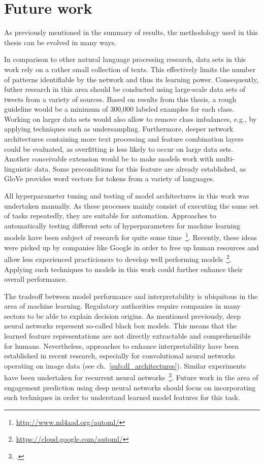 \section{Future work}
\label{ch:future_work}

As previously mentioned in the summary of results, the methodology used in this
thesis can be evolved in many ways.

In comparison to other natural language processing research, data sets in this
work rely on a rather small collection of texts.
This effectively limits the number of patterns identifiable by the network and
thus its learning power.
Consequently, futher research in this area should be conducted using large-scale
data sets of tweets from a variety of sources.
Based on results from this thesis, a rough guideline would be a minimum
of 300,000 labeled examples for each class.
Working on larger data sets would also allow to remove class imbalances,
e.g., by applying techniques such as undersampling.
Furthermore, deeper network architectures containing more text processing
and feature combination layers could be evaluated, as overfitting is less likely
to occur on large data sets.
Another conceivable extension would be to make models work with multi-linguistic
data.
Some preconditions for this feature are already established, as GloVe provides word
vectors for tokens from a variety of languages.

All hyperparameter tuning and testing of model architectures in this work was
undertaken manually.
As these processes mainly consist of executing the same set of tasks repeatedly,
they are suitable for automation.
Approaches to automatically testing different sets of hyperparameters for
machine learning models have been subject of research for quite some time~\footnote{\url{http://www.ml4aad.org/automl/}}.
Recently, these ideas were picked up by companies like Google in order to free
up human resources and allow less experienced practicioners to develop
well performing models~\footnote{\url{https://cloud.google.com/automl/}}.
Applying such techniques to models in this work could further enhance their
overall performance.

The tradeoff between model performance and interpretability is ubiquitous in
the area of machine learning.
Regulatory authorities require companies in many sectors to be able to explain
decision origins.
As mentioned previously, deep neural networks represent so-called black box models.
This means that the learned feature representations are not directly extractable
and comprehensible for humans.
Nevertheless, approaches to enhance interpretability have been established
in recent research, especially for convolutional neural networks operating
on image data (see ch.~\ref{sub:dl_architectures}).
Similar experiments have been undertaken for recurrent neural networks~\footcite{Karpathy2015}.
Future work in the area of engagement prediction using deep neural networks
should focus on incorporating such techniques in order to understand learned
model features for this task.

